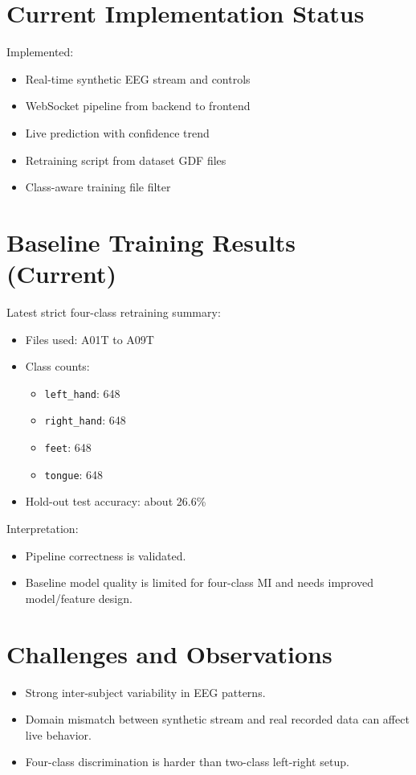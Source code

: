 \documentclass[12pt,a4paper]{article}
\begin{document}
\section{Current Implementation Status}
Implemented:
\begin{itemize}[leftmargin=1.5em]
  \item Real-time synthetic EEG stream and controls
  \item WebSocket pipeline from backend to frontend
  \item Live prediction with confidence trend
  \item Retraining script from dataset GDF files
  \item Class-aware training file filter
\end{itemize}

\section{Baseline Training Results (Current)}
Latest strict four-class retraining summary:
\begin{itemize}[leftmargin=1.5em]
  \item Files used: A01T to A09T
  \item Class counts:
  \begin{itemize}[leftmargin=1.5em]
    \item \texttt{left\_hand}: 648
    \item \texttt{right\_hand}: 648
    \item \texttt{feet}: 648
    \item \texttt{tongue}: 648
  \end{itemize}
  \item Hold-out test accuracy: about 26.6\%
\end{itemize}

Interpretation:
\begin{itemize}[leftmargin=1.5em]
  \item Pipeline correctness is validated.
  \item Baseline model quality is limited for four-class MI and needs improved model/feature design.
\end{itemize}

\section{Challenges and Observations}
\begin{itemize}[leftmargin=1.5em]
  \item Strong inter-subject variability in EEG patterns.
  \item Domain mismatch between synthetic stream and real recorded data can affect live behavior.
  \item Four-class discrimination is harder than two-class left-right setup.
\end{itemize}
\end{document}

